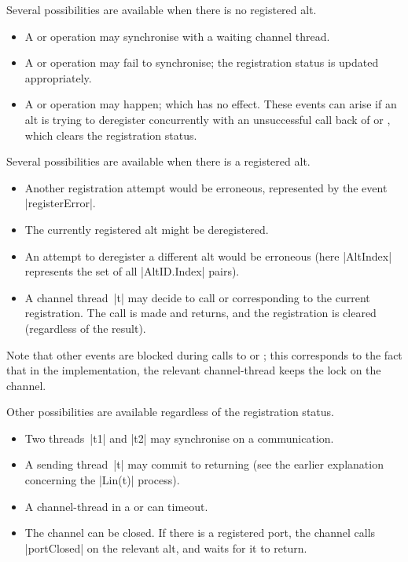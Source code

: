 Several possibilities are available when there is no registered alt.
%
\begin{itemize}
\item A  or  operation may synchronise
  with a waiting channel thread.

\item A  or  operation may fail to
  synchronise; the registration status is updated appropriately.

\item A  or  operation may happen;
  which has no effect.  These events can arise if an alt is trying to
  deregister concurrently with an unsuccessful call back of
   or , which clears the registration
  status. 
\end{itemize}

Several possibilities are available when there is a registered alt.
%
\begin{itemize}
\item Another registration attempt would be erroneous, represented by the
  event |registerError|.

\item The currently registered alt might be deregistered.

\item An attempt to deregister a different alt would be erroneous (here
  |AltIndex| represents the set of all |AltID.Index| pairs).

\item A channel thread~|t| may decide to call  or
   corresponding to the current registration.  The call is
  made and returns, and the registration is cleared (regardless of the
  result). 
\end{itemize}
%
Note that other events are blocked during calls to  or
; this corresponds to the fact that in the implementation,
the relevant channel-thread keeps the lock on the channel.

Other possibilities are available regardless of the registration status.
%
\begin{itemize}
\item Two threads~|t1| and |t2| may synchronise on a communication.

\item A sending thread~|t| may commit to returning (see the earlier
  explanation concerning the |Lin(t)| process). 

\item A channel-thread in a  or  can
  timeout. 

\item The channel can be closed.  If there is a registered port, the channel
  calls |portClosed| on the relevant alt, and waits for it to return.
\end{itemize}

